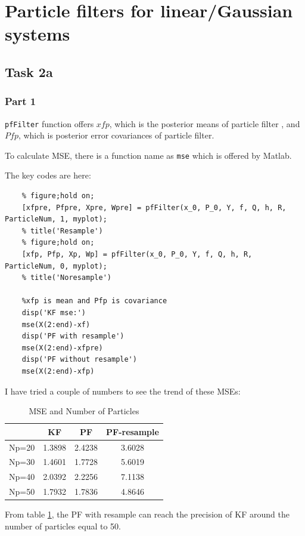 \section{Particle filters for linear/Gaussian systems}
\subsection{Task 2a}
\subsubsection{Part 1}

\texttt{pfFilter} function offers $ xfp $, which is the posterior means of particle filter , and $ Pfp $, which is posterior error covariances of particle filter.

To calculate MSE, there is a function name as \texttt{mse} which is offered by Matlab.

The key codes are here:

\begin{lstlisting}
    % figure;hold on;
    [xfpre, Pfpre, Xpre, Wpre] = pfFilter(x_0, P_0, Y, f, Q, h, R, ParticleNum, 1, myplot);
    % title('Resample')
    % figure;hold on;
    [xfp, Pfp, Xp, Wp] = pfFilter(x_0, P_0, Y, f, Q, h, R, ParticleNum, 0, myplot);
    % title('Noresample')
    
    %xfp is mean and Pfp is covariance
    disp('KF mse:')
    mse(X(2:end)-xf)
    disp('PF with resample')
    mse(X(2:end)-xfpre)
    disp('PF without resample')
    mse(X(2:end)-xfp)
\end{lstlisting}

I have tried a couple of numbers to see the trend of these MSEs:

\begin{table}[htbp]
	\centering
	\caption{MSE and Number of Particles }
    \label{MSE}
	\begin{tabular}{cccc}
		\hline
         & KF& PF  & PF-resample \\ \hline
		 Np=20& 1.3898 & 2.4238 & 3.6028 \\
		 Np=30& 1.4601 & 1.7728 & 5.6019 \\
         Np=40& 2.0392 & 2.2256 & 7.1138 \\
		 Np=50& 1.7932 & 1.7836 & 4.8646 \\ \hline
	\end{tabular}
\end{table}

From table \ref{MSE}, the PF with resample can reach the precision of KF around the number of particles equal to 50.


